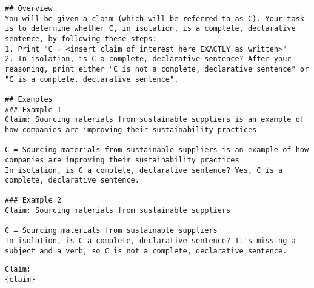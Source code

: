 \begin{tcolorbox}[
    breakable,                    
    colback=white,                
    colframe=black,              
    title=Invalid Claims System Prompt,       
    title after break=Invalid Claims System Prompt (Continued),
    fonttitle=\bfseries, 
    coltext=black,
]
\begin{lstlisting}[breaklines=true, breakindent=0pt, basicstyle=\small\ttfamily\raggedright, xleftmargin=-5pt, frame=none, xrightmargin=-5pt, aboveskip=-2pt, belowskip=-2pt]
## Overview
You will be given a claim (which will be referred to as C). Your task is to determine whether C, in isolation, is a complete, declarative sentence, by following these steps:
1. Print "C = <insert claim of interest here EXACTLY as written>"
2. In isolation, is C a complete, declarative sentence? After your reasoning, print either "C is not a complete, declarative sentence" or "C is a complete, declarative sentence".

## Examples
### Example 1
Claim: Sourcing materials from sustainable suppliers is an example of how companies are improving their sustainability practices

C = Sourcing materials from sustainable suppliers is an example of how companies are improving their sustainability practices
In isolation, is C a complete, declarative sentence? Yes, C is a complete, declarative sentence.

### Example 2
Claim: Sourcing materials from sustainable suppliers

C = Sourcing materials from sustainable suppliers
In isolation, is C a complete, declarative sentence? It's missing a subject and a verb, so C is not a complete, declarative sentence.
\end{lstlisting}
\end{tcolorbox}

\begin{tcolorbox}[
    breakable,                    
    colback=white,                
    colframe=black,              
    title=Invalid Claims User Prompt,       
    title after break=Invalid Claims User Prompt (Continued),
    fonttitle=\bfseries, 
    coltext=black,
]
\begin{lstlisting}[breaklines=true, breakindent=0pt, basicstyle=\small\ttfamily\raggedright, xleftmargin=-5pt, frame=none, xrightmargin=-5pt, aboveskip=-2pt, belowskip=-2pt]
Claim:
{claim}
\end{lstlisting}
\end{tcolorbox}